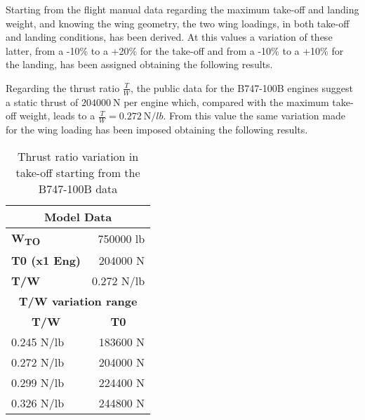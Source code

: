 \bigskip
\noindent
Starting from the flight manual data regarding the maximum take-off and landing weight, and knowing the wing geometry, the two wing loadings, in both take-off and landing conditions, has been derived. At this values a variation of these latter, from a -10\% to a +20\% for the take-off and from a -10\% to a +10\% for the landing, has been assigned obtaining the following results.  
%
\begin{table}[H]
  \centering
    \caption{Wing loading variation in take-off and landing starting from the B747-100B data}
    \label{tab:WS}
\end{table}
%
\noindent
Regarding the thrust ratio $\frac{T}{W}$, the public data for the B747-100B engines suggest a static thrust of $\SI{204000}{\newton}$ per engine which, compared with the maximum take-off weight, leads to a $\frac{T}{W}=0.272\ \si{\newton}/\si{lb}$. From this value the same variation made for the wing loading has been imposed obtaining the following results.
%
\begin{table}[H]
  \centering
    \begin{tabular}{lr}
    \toprule
    \multicolumn{2}{c}{\textbf{Model Data}} \\
    \midrule
    \textbf{W\textsubscript{TO}} & 750000 lb \\
    \textbf{T0 (x1 Eng)} & 204000 N \\
    \textbf{T/W} & 0.272 N/lb \\
    \midrule
    \multicolumn{2}{c}{\textbf{T/W variation range}} \\
    \midrule
    \multicolumn{1}{c}{\textbf{T/W}} & \multicolumn{1}{c}{\textbf{T0}} \\
    0.245 N/lb & 183600 N \\
    0.272 N/lb & 204000 N \\
    0.299 N/lb & 224400 N \\
    0.326 N/lb & 244800 N \\
    \bottomrule
    \end{tabular}%
  \caption{Thrust ratio variation in take-off starting from the B747-100B data}
  \label{tab:TW}
\end{table}%
